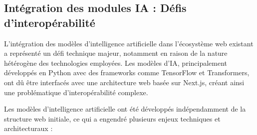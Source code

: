 \documentclass[12pt]{rapportPfe}
\begin{document}
\subsection{Intégration des modules IA : Défis d'interopérabilité}

L'intégration des modèles d'intelligence artificielle dans l'écosystème web existant a représenté un défi technique majeur, notamment en raison de la nature hétérogène des technologies employées. Les modèles d'IA, principalement développés en Python avec des frameworks comme TensorFlow et Transformers, ont dû être interfacés avec une architecture web basée sur Next.js, créant ainsi une problématique d'interopérabilité complexe.

Les modèles d'intelligence artificielle ont été développés indépendamment de la structure web initiale, ce qui a engendré plusieurs enjeux techniques et architecturaux :
\end{document}
